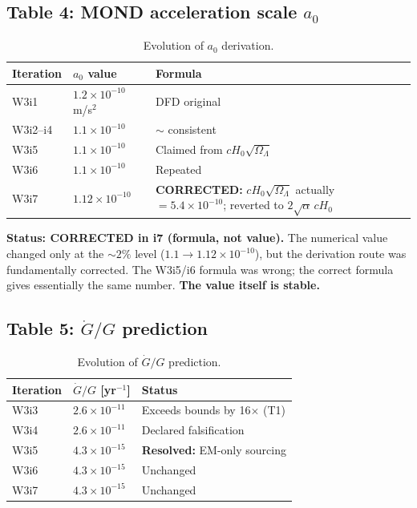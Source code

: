 \documentclass[11pt]{article}
\newcommand{\ee}[1]{\times 10^{#1}}
\begin{document}
\subsection{Table 4: MOND acceleration scale $a_0$}

\begin{table}[H]
\centering
\caption{Evolution of $a_0$ derivation.}
\label{tab:a0}
\begin{tabular}{lll}
\toprule
\textbf{Iteration} & $a_0$ \textbf{value} & \textbf{Formula} \\
\midrule
W3i1 & $1.2\ee{-10}$ m/s$^2$ & DFD original \\
W3i2--i4 & $1.1\ee{-10}$ & $\sim$ consistent \\
W3i5 & $1.1\ee{-10}$ & Claimed from $cH_0\sqrt{\Omega_\Lambda}$ \\
W3i6 & $1.1\ee{-10}$ & Repeated \\
W3i7 & $1.12\ee{-10}$ & \textbf{CORRECTED:} $cH_0\sqrt{\Omega_\Lambda}$
  actually $= 5.4\ee{-10}$; reverted to $2\sqrt{\alpha}\,cH_0$ \\
\bottomrule
\end{tabular}
\end{table}

\textbf{Status: \textcolor{converging}{CORRECTED in i7 (formula, not value).}}
The numerical value changed only at the $\sim 2\%$ level
($1.1 \to 1.12\ee{-10}$), but the derivation route was fundamentally
corrected. The W3i5/i6 formula was wrong; the correct formula gives
essentially the same number. \textbf{The value itself is stable.}

\subsection{Table 5: $\dot{G}/G$ prediction}

\begin{table}[H]
\centering
\caption{Evolution of $\dot{G}/G$ prediction.}
\label{tab:Gdot}
\begin{tabular}{lll}
\toprule
\textbf{Iteration} & $\dot{G}/G$ [yr$^{-1}$] & \textbf{Status} \\
\midrule
W3i3 & $2.6\ee{-11}$ & Exceeds bounds by 16$\times$ (T1) \\
W3i4 & $2.6\ee{-11}$ & Declared falsification \\
W3i5 & $4.3\ee{-15}$ & \textbf{Resolved:} EM-only sourcing \\
W3i6 & $4.3\ee{-15}$ & Unchanged \\
W3i7 & $4.3\ee{-15}$ & Unchanged \\
\bottomrule
\end{tabular}
\end{table}
\end{document}
